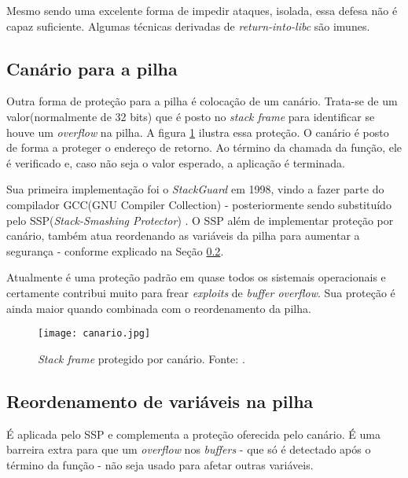 			Mesmo sendo uma excelente forma de impedir ataques, isolada, essa defesa não é capaz
			suficiente. Algumas técnicas derivadas de \textsl{return-into-libc} são imunes.


		\subsection{Canário para a pilha}
			Outra forma de proteção para a pilha é colocação de um canário.
			Trata-se de um valor(normalmente de 32 bits) que é posto no \textsl{stack frame}
			para identificar se houve um \textsl{overflow} na pilha.
			A figura \ref{fig:canario} ilustra essa proteção. O canário é posto de forma
			a proteger o endereço de retorno. Ao término da chamada da função, ele é verificado
			e, caso não seja o valor esperado, a aplicação é terminada.


			Sua primeira implementação foi o  \textsl{StackGuard} em 1998, vindo a fazer
			parte do compilador GCC(GNU Compiler Collection) - posteriormente sendo
			substituído pelo SSP(\textsl{Stack-Smashing Protector}) \cite{Martins2009}.
			O SSP além de implementar proteção por canário, também atua reordenando
			as variáveis da pilha para aumentar a segurança - conforme explicado 
			na Seção \ref{subsec:reordenamento_pilha}.

			
			Atualmente é uma proteção padrão em quase todos os sistemais operacionais e certamente
			contribui muito para frear \textsl{exploits} de \textsl{buffer overflow}. Sua
			proteção é ainda maior quando combinada com o reordenamento da pilha.
			

			\begin{figure}
				\begin{center}
					\texttt{[image: canario.jpg]}
					\caption{\textsl{Stack frame} protegido por canário. Fonte: \cite{Furlan2005}.}
					\label{fig:canario}
				\end{center}
			\end{figure}

		\subsection{Reordenamento de variáveis na pilha}
		\label{subsec:reordenamento_pilha}
			É aplicada pelo SSP e complementa a proteção oferecida pelo canário.
			É uma barreira extra para que um \textsl{overflow} nos \textsl{buffers} - que só
			é detectado após o término da função - não seja usado para afetar outras variáveis.


